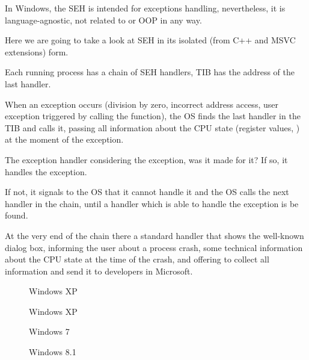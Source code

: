 
In Windows, the \ac{SEH} is intended for exceptions handling, nevertheless, it is language-agnostic,
not related to \Cpp or \ac{OOP} in any way.

Here we are going to take a look at \ac{SEH} in its isolated (from C++ and MSVC extensions) form.


Each running process has a chain of \ac{SEH} handlers, \ac{TIB} has the address of the last handler.

When an exception occurs (division by zero, incorrect address access, user exception triggered by
calling the  function), the \ac{OS} finds the last handler in the \ac{TIB} and calls it,
passing all information about the \ac{CPU} state (register values, \etc{}) at the moment of the exception.

The exception handler considering the exception, was it made for it?
If so, it handles the exception.

If not, it signals to the \ac{OS} that it
cannot handle it and the \ac{OS} calls the next handler in the chain,
until a handler which is able to handle the exception is be found.

At the very end of the chain there a standard handler that shows the well-known dialog box, informing the user about a
process crash, some technical information about the \ac{CPU} state at the time of the crash,
and offering to collect all information and send it to developers in Microsoft. 

\begin{figure}[H]
\centering
{}
\caption{Windows XP}
\end{figure}

\begin{figure}[H]
\centering
{}
\caption{Windows XP}
\end{figure}

\begin{figure}[H]
\centering
{}
\caption{Windows 7}
\end{figure}

\begin{figure}[H]
\centering
{}
\caption{Windows 8.1}
\end{figure}


